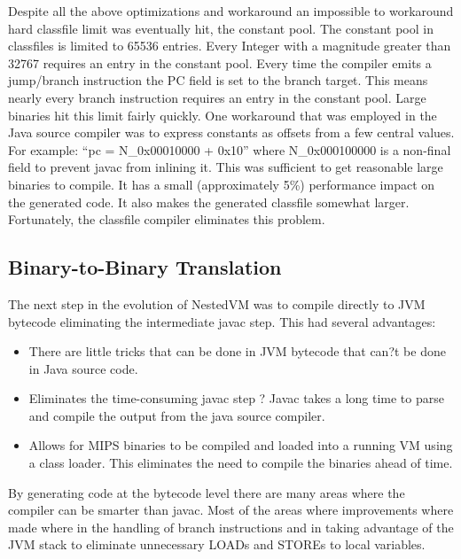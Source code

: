 \documentclass{acmconf}
\begin{document}
Despite all the above optimizations and workaround an impossible to
workaround hard classfile limit was eventually hit, the constant
pool. The constant pool in classfiles is limited to 65536
entries. Every Integer with a magnitude greater than 32767 requires an
entry in the constant pool. Every time the compiler emits a
jump/branch instruction the PC field is set to the branch target. This
means nearly every branch instruction requires an entry in the
constant pool. Large binaries hit this limit fairly quickly. One
workaround that was employed in the Java source compiler was to
express constants as offsets from a few central values. For example:
``pc = N\_0x00010000 + 0x10'' where N\_0x000100000 is a non-final
field to prevent javac from inlining it. This was sufficient to get
reasonable large binaries to compile. It has a small (approximately
5\%) performance impact on the generated code. It also makes the
generated classfile somewhat larger.  Fortunately, the classfile
compiler eliminates this problem.


\subsection{Binary-to-Binary Translation}

The next step in the evolution of NestedVM was to compile directly to
JVM bytecode eliminating the intermediate javac step. This had several
advantages:

\begin{itemize}
      
\item There are little tricks that can be done in JVM bytecode that
      can?t be done in Java source code.

\item Eliminates the time-consuming javac step ? Javac takes a long
      time to parse and compile the output from the java source
      compiler.

\item Allows for MIPS binaries to be compiled and loaded into a
      running VM using a class loader. This eliminates the need to
      compile the binaries ahead of time.

\end{itemize}

By generating code at the bytecode level there are many areas where
the compiler can be smarter than javac. Most of the areas where
improvements where made where in the handling of branch instructions
and in taking advantage of the JVM stack to eliminate unnecessary
LOADs and STOREs to local variables.
\end{document}
